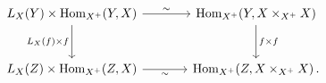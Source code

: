 \[
\begin{tikzcd}[column sep=large,row sep=large]
  L_X(Y)\times\operatorname{Hom}_{X^+}(Y,X)
    \arrow[r,"\sim"]
    \arrow[d,"L_X(f)\times f"']
  &
  \operatorname{Hom}_{X^+}
    \!\left(Y,X\times_{X^+}X\right)
    \arrow[d,"f\times f"]
  \\
  L_X(Z)\times\operatorname{Hom}_{X^+}(Z,X)
    \arrow[r,"\sim"']
  &
  \operatorname{Hom}_{X^+}
    \!\left(Z,X\times_{X^+}X\right).
\end{tikzcd}
\]
